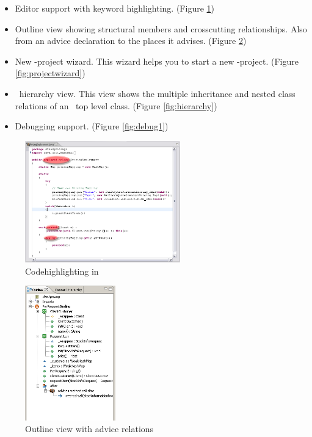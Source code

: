 \begin{itemize}

\item Editor support with keyword highlighting. (Figure \ref{fig:hilight})
	
\item Outline view showing structural members and crosscutting relationships. Also from an advice declaration to the places it advises. (Figure \ref{fig:outline})

\item New \caesarj -project wizard. This wizard helps you to start a new \caesarj -project. (Figure \ref{fig:projectwizard})
  
     
\item \caesarj ~hierarchy view. This view shows the multiple inheritance and nested class relations of an \caesarj ~top level class. (Figure \ref{fig:hierarchy})
  
\item Debugging support. (Figure \ref{fig:debug1})
  
\end{itemize}


\begin{figure}[htbp]
	\centering
		\includegraphics[width=0.60\textwidth]{images/hilight.png}
	\caption{Codehighlighting in \cjdt}
	\label{fig:hilight}
\end{figure}

\begin{figure}[htbp]
	\centering
		\includegraphics[width=0.35\textwidth]{images/outline.png}
	\caption{Outline view with advice relations}
	\label{fig:outline}
\end{figure}

